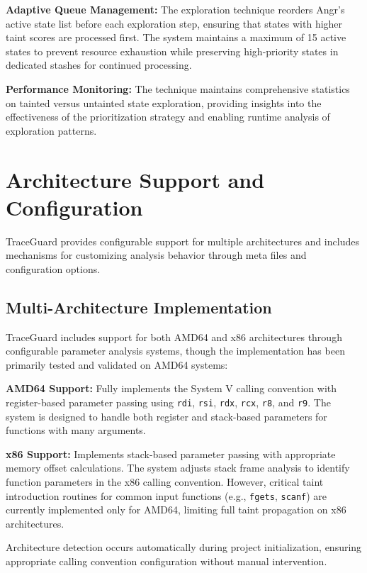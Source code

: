 \textbf{Adaptive Queue Management:} The exploration technique reorders Angr's active state list before each exploration step, ensuring that states with higher taint scores are processed first. The system maintains a maximum of 15 active states to prevent resource exhaustion while preserving high-priority states in dedicated stashes for continued processing.

\textbf{Performance Monitoring:} The technique maintains comprehensive statistics on tainted versus untainted state exploration, providing insights into the effectiveness of the prioritization strategy and enabling runtime analysis of exploration patterns.

\section{Architecture Support and Configuration}

TraceGuard provides configurable support for multiple architectures and includes mechanisms for customizing analysis behavior through meta files and configuration options.

\subsection{Multi-Architecture Implementation}

TraceGuard includes support for both AMD64 and x86 architectures through configurable parameter analysis systems, though the implementation has been primarily tested and validated on AMD64 systems:

\textbf{AMD64 Support:} Fully implements the System V calling convention with register-based parameter passing using \texttt{rdi}, \texttt{rsi}, \texttt{rdx}, \texttt{rcx}, \texttt{r8}, and \texttt{r9}. The system is designed to handle both register and stack-based parameters for functions with many arguments.

\textbf{x86 Support:} Implements stack-based parameter passing with appropriate memory offset calculations. The system adjusts stack frame analysis to identify function parameters in the x86 calling convention. However, critical taint introduction routines for common input functions (e.g., \texttt{fgets}, \texttt{scanf}) are currently implemented only for AMD64, limiting full taint propagation on x86 architectures.

Architecture detection occurs automatically during project initialization, ensuring appropriate calling convention configuration without manual intervention.


